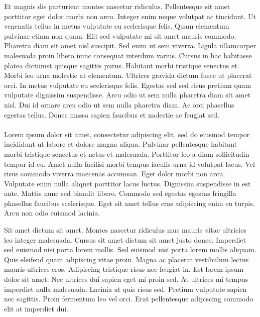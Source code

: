 \documentclass{book}
\begin{document}
Et magnis dis parturient montes nascetur ridiculus. Pellentesque sit amet porttitor eget dolor morbi non arcu. Integer enim neque volutpat ac tincidunt. Ut venenatis tellus in metus vulputate eu scelerisque felis. Quam elementum pulvinar etiam non quam. Elit sed vulputate mi sit amet mauris commodo. Pharetra diam sit amet nisl suscipit. Sed enim ut sem viverra. Ligula ullamcorper malesuada proin libero nunc consequat interdum varius. Cursus in hac habitasse platea dictumst quisque sagittis purus. Habitant morbi tristique senectus et. Morbi leo urna molestie at elementum. Ultrices gravida dictum fusce ut placerat orci. In metus vulputate eu scelerisque felis. Egestas sed sed risus pretium quam vulputate dignissim suspendisse. Arcu odio ut sem nulla pharetra diam sit amet nisl. Dui id ornare arcu odio ut sem nulla pharetra diam. Ac orci phasellus egestas tellus. Donec massa sapien faucibus et molestie ac feugiat sed.
\subsection{}
Lorem ipsum dolor sit amet, consectetur adipiscing elit, sed do eiusmod tempor incididunt ut labore et dolore magna aliqua. Pulvinar pellentesque habitant morbi tristique senectus et netus et malesuada. Porttitor leo a diam sollicitudin tempor id eu. Amet nulla facilisi morbi tempus iaculis urna id volutpat lacus. Vel risus commodo viverra maecenas accumsan. Eget dolor morbi non arcu. Vulputate enim nulla aliquet porttitor lacus luctus. Dignissim suspendisse in est ante. Mattis nunc sed blandit libero. Commodo sed egestas egestas fringilla phasellus faucibus scelerisque. Eget sit amet tellus cras adipiscing enim eu turpis. Arcu non odio euismod lacinia.

Sit amet dictum sit amet. Montes nascetur ridiculus mus mauris vitae ultricies leo integer malesuada. Cursus sit amet dictum sit amet justo donec. Imperdiet sed euismod nisi porta lorem mollis. Sed euismod nisi porta lorem mollis aliquam. Quis eleifend quam adipiscing vitae proin. Magna ac placerat vestibulum lectus mauris ultrices eros. Adipiscing tristique risus nec feugiat in. Est lorem ipsum dolor sit amet. Nec ultrices dui sapien eget mi proin sed. At ultrices mi tempus imperdiet nulla malesuada. Lacinia at quis risus sed. Pretium vulputate sapien nec sagittis. Proin fermentum leo vel orci. Erat pellentesque adipiscing commodo elit at imperdiet dui.
\part{}
\end{document}
